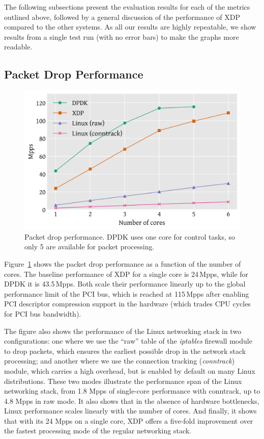 \documentclass[sigconf]{acmart}
\begin{document}
The following subsections present the evaluation results for each of the metrics
outlined above, followed by a general discussion of the performance of XDP
compared to the other systems. As all our results are highly repeatable, we show
results from a single test run (with no error bars) to make the graphs more
readable.

\subsection{Packet Drop Performance}
\label{sec:basel-pack-proc}

\begin{figure}[t]
\centering
\includegraphics[width=\linewidth]{figures/drop-test.pdf}
\caption{\label{fig:drop-test} Packet drop performance. DPDK uses one core for
  control tasks, so only 5 are available for packet processing.}
\end{figure}

Figure~\ref{fig:drop-test} shows the packet drop performance as a function of
the number of cores. The baseline performance of XDP for a single core is
24\,Mpps, while for DPDK it is 43.5\,Mpps. Both scale their performance linearly
up to the global performance limit of the PCI bus, which is reached at 115\,Mpps
after enabling PCI descriptor compression support in the hardware (which trades
CPU cycles for PCI bus bandwidth).


The figure also shows the performance of the Linux networking stack in two
configurations: one where we use the ``raw'' table of the \emph{iptables}
firewall module to drop packets, which ensures the earliest possible drop in the
network stack processing; and another where we use the connection tracking
(\emph{conntrack}) module, which carries a high overhead, but is enabled by
default on many Linux distributions. These two modes illustrate the performance
span of the Linux networking stack, from 1.8 Mpps of single-core performance
with conntrack, up to 4.8 Mpps in raw mode. It also shows that in the absence of
hardware bottlenecks, Linux performance scales linearly with the number of
cores. And finally, it shows that with its 24 Mpps on a single core, XDP offers
a five-fold improvement over the fastest processing mode of the regular
networking stack.
\end{document}
